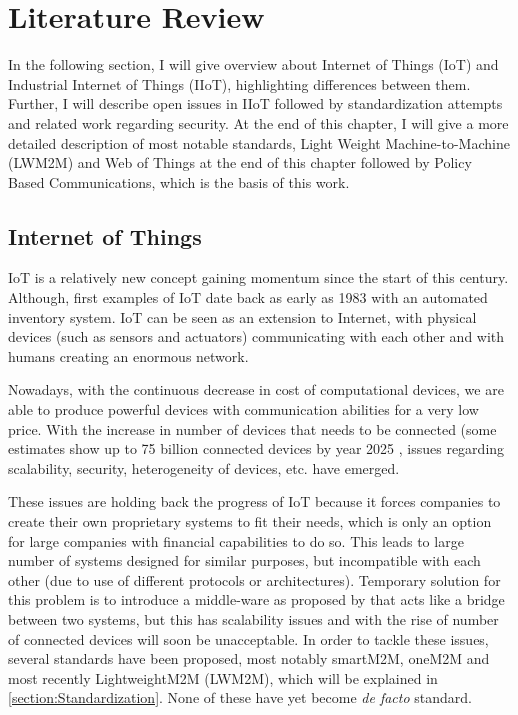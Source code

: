 \chapter{Literature Review}
\label{chapter:background} 

In the following section, I will give overview about Internet of Things (IoT) and Industrial Internet of Things (IIoT), highlighting differences between them. Further, I will describe open issues in IIoT followed by standardization attempts and related work regarding security. At the end of this chapter, I will give a more detailed description of most notable standards, Light Weight Machine-to-Machine (LWM2M) and Web of Things at the end of this chapter followed by Policy Based Communications, which is the basis of this work.

\section{Internet of Things}

IoT is a relatively new concept gaining momentum since the start of this century. Although, first examples
of IoT date back as early as 1983 with an automated inventory system. IoT can be seen as an extension to Internet, with physical devices (such as sensors and actuators) communicating with each other and with humans creating an enormous network.

Nowadays, with the continuous decrease in cost of computational devices, 
we are able to produce powerful devices with communication abilities for a very low price. With the increase in number 
of devices that needs to be connected (some estimates show up to 75 billion connected devices by year 2025 \cite{statista}, issues regarding scalability, security, heterogeneity of devices, etc. have emerged. 

These issues are holding back the progress of IoT because it forces companies to create their own proprietary systems to fit their needs, which is only an option for
large companies with financial capabilities to do so. This leads to large number of systems designed for similar purposes, but incompatible with each other (due to use of different protocols or architectures). Temporary solution for this problem is to introduce a middle-ware as proposed by \cite{Bandyopadhyay2011} that acts like a bridge between two systems, but this has scalability issues and with the rise of number of connected devices will soon be unacceptable. In order to tackle these issues, several standards have been proposed, most notably smartM2M, oneM2M and most recently LightweightM2M (LWM2M), which will be explained in \ref{section:Standardization}. None of these have yet become \emph{de facto} standard.

